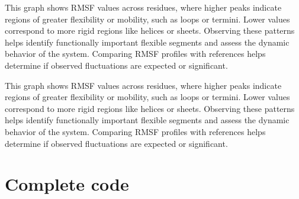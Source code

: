 \documentclass[a4paper,10pt,english]{sphinxmanual}
\let\sphinxpxdimen\pdfpxdimen\else\newdimen\sphinxpxdimen
\begin{document}
\noindent{}

\sphinxAtStartPar
{} This graph shows RMSF values across residues, where higher peaks indicate regions of greater flexibility or mobility, such as loops or termini. Lower values correspond to more rigid regions like helices or sheets. Observing these patterns helps identify functionally important flexible segments and assess the dynamic behavior of the system. Comparing RMSF profiles with references helps determine if observed fluctuations are expected or significant.

\begin{sphinxVerbatim}[commandchars=\\\{\}]
  
\end{sphinxVerbatim}

\noindent{\hspace*{\fill}\sphinxincludegraphics[width=500\sphinxpxdimen]{{RMSF_density}.png}\hspace*{\fill}}

\sphinxAtStartPar
{} This graph shows RMSF values across residues, where higher peaks indicate regions of greater flexibility or mobility, such as loops or termini. Lower values correspond to more rigid regions like helices or sheets. Observing these patterns helps identify functionally important flexible segments and assess the dynamic behavior of the system. Comparing RMSF profiles with references helps determine if observed fluctuations are expected or significant.


\section{Complete code}
\label{\detokenize{RMSF:complete-code}}
\begin{sphinxVerbatim}[commandchars=\\\{\}]
 
\end{sphinxVerbatim}
\end{document}
